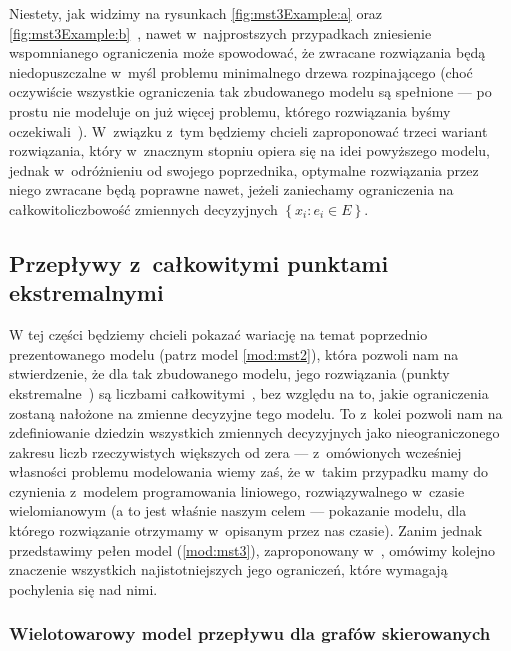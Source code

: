 Niestety, jak widzimy na rysunkach \ref{fig:mst3Example:a} oraz \ref{fig:mst3Example:b}~\cite[$41$]{Magnanti1995503}, nawet w~najprostszych przypadkach zniesienie wspomnianego ograniczenia może spowodować, że zwracane rozwiązania będą niedopuszczalne w~myśl problemu minimalnego drzewa rozpinającego (choć oczywiście wszystkie ograniczenia tak zbudowanego modelu są spełnione --- po prostu nie modeluje on już więcej problemu, którego rozwiązania byśmy oczekiwali~\cite[$39$]{Magnanti1995503}).
W~związku z~tym będziemy chcieli zaproponować trzeci wariant rozwiązania, który w~znacznym stopniu opiera się na idei powyższego modelu, jednak w~odróżnieniu od swojego poprzednika, optymalne rozwiązania przez niego zwracane będą poprawne nawet, jeżeli zaniechamy ograniczenia na całkowitoliczbowość zmiennych decyzyjnych $\left\{ x_{i} : e_{i} \in E \right\}$.



\subsection{Przepływy z~całkowitymi punktami ekstremalnymi}



W tej części będziemy chcieli pokazać wariację na temat poprzednio prezentowanego modelu (patrz model \ref{mod:mst2}), która pozwoli nam na stwierdzenie, że dla tak zbudowanego modelu, jego rozwiązania (punkty ekstremalne~\cite{Papadimitriou:1982:COA:31027}) są liczbami całkowitymi~\cite[$42$--$46$]{Magnanti1995503}, bez względu na to, jakie ograniczenia zostaną nałożone na zmienne decyzyjne tego modelu.
To z~kolei pozwoli nam na zdefiniowanie dziedzin wszystkich zmiennych decyzyjnych jako nieograniczonego zakresu liczb rzeczywistych większych od zera --- z~omówionych wcześniej własności problemu modelowania wiemy zaś, że w~takim przypadku mamy do czynienia z~modelem programowania liniowego, rozwiązywalnego w~czasie wielomianowym (a to jest właśnie naszym celem --- pokazanie modelu, dla którego rozwiązanie otrzymamy w~opisanym przez nas czasie).
Zanim jednak przedstawimy pełen model (\ref{mod:mst3}), zaproponowany w~\cite[$42$--$46$]{Magnanti1995503}, omówimy kolejno znaczenie wszystkich najistotniejszych jego ograniczeń, które wymagają pochylenia się nad nimi.


\subsubsection{Wielotowarowy model przepływu dla grafów skierowanych} 


